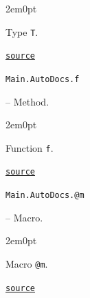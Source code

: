 \begin{adjustwidth}{2em}{0pt}

Type \texttt{T}.



\href{https://example.org/Repository.jl/blob/make.jl#L94-94}{\texttt{source}}


\end{adjustwidth}
\hypertarget{14053004641171891989}{\texttt{Main.AutoDocs.f}}  -- {Method.}

\begin{adjustwidth}{2em}{0pt}

Function \texttt{f}.



\href{https://example.org/Repository.jl/blob/make.jl#L88-88}{\texttt{source}}


\end{adjustwidth}
\hypertarget{7256264955516068825}{\texttt{Main.AutoDocs.@m}}  -- {Macro.}

\begin{adjustwidth}{2em}{0pt}

Macro \texttt{@m}.



\href{https://example.org/Repository.jl/blob/make.jl#L97-97}{\texttt{source}}


\end{adjustwidth}


